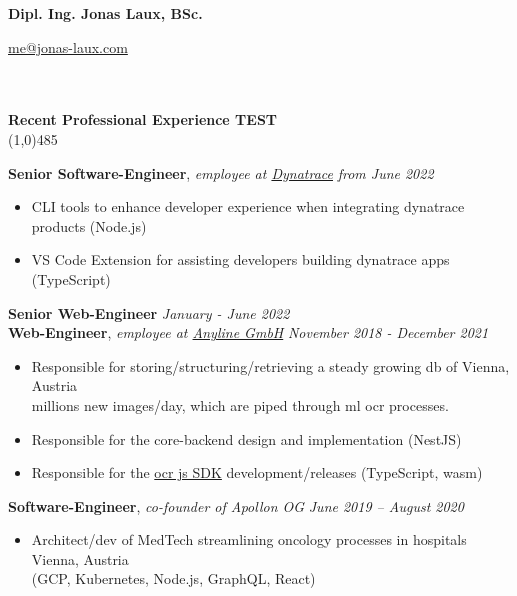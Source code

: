 \documentclass[9pt]{extarticle}
\newcommand\negativespace[1][-0.12cm]{\hspace*{#1}}
\begin{document}
\centerline{{\LARGE \bf Dipl. Ing. Jonas Laux, BSc.}}
\centerline{\href{mailto:me@jonas-laux.com}{me@jonas-laux.com}}


\noindent %
\\\\
\vspace*{-6pt}
{\negativespace \Large \bf Recent Professional Experience TEST}\\
\line(1,0){485}
\\
\noindent

\noindent
{\bf Senior Software-Engineer}, \textit{employee at \href{https://dynatrace.com}{Dynatrace}}  \hfill \textit{from June 2022}
\begin{itemize}
\setlength\itemsep{0.05em}
\item CLI tools to enhance developer experience when integrating dynatrace products (Node.js)
\item VS Code Extension for assisting developers building dynatrace apps (TypeScript)\\
\end{itemize}

\noindent
{\bf Senior Web-Engineer}  \hfill \textit{January - June 2022} \\
{\bf Web-Engineer}, \textit{employee at \href{https://anyline.com}{Anyline GmbH}}  \hfill \textit{November 2018 - December 2021} 
\begin{itemize}
\setlength\itemsep{0.05em}
\item Responsible for storing/structuring/retrieving a steady growing db of  \hfill Vienna, Austria \\ 
millions new images/day, which are piped through ml ocr processes.
\item Responsible for the core-backend design and implementation (NestJS)
\item Responsible for the \href{https://github.com/Anyline/anyline-ocr-anylinejs-module}{ocr js SDK} development/releases (TypeScript, wasm) \\
\end{itemize}

\noindent
{\bf Software-Engineer}, \textit{co-founder of Apollon OG}  \hfill \textit{June 2019 -- August 2020}
\begin{itemize}
\setlength\itemsep{0.05em}
\item Architect/dev of MedTech streamlining oncology processes in hospitals \hfill Vienna, Austria \\
(GCP, Kubernetes, Node.js, GraphQL, React) \\
\end{itemize}
\end{document}
